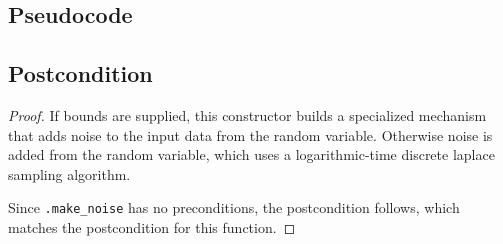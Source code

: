 \documentclass{article}
\begin{document}
\subsection*{Pseudocode}


\subsection*{Postcondition}
\begin{theorem}
\end{theorem}

\begin{proof}
    If bounds are supplied, this constructor builds a specialized mechanism 
    that adds noise to the input data from the  random variable.
    Otherwise noise is added from the  random variable, 
    which uses a logarithmic-time discrete laplace sampling algorithm.
    
    Since \texttt{.make\_noise} has no preconditions,
    the postcondition follows, which matches the postcondition for this function.
\end{proof}
\end{document}
